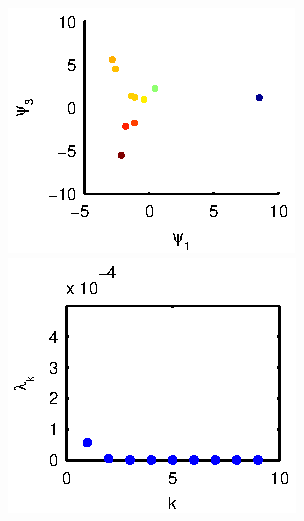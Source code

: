 \begin{figure}[t]
\centering
\begin{subfigure}{0.22\textwidth}
\includegraphics[width=\textwidth]{rxn_npoints_embed1}
\includegraphics[width=\textwidth]{rxn_npoints_spectrum1}
\caption{}
\label{subfig:rxn_convergence1}
\end{subfigure}
\hfill
\begin{subfigure}{0.22\textwidth}

\end{subfigure}
\end{figure}
